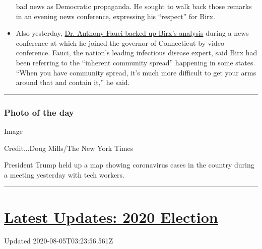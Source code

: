 \begin{itemize}
  bad news as Democratic propaganda. He sought to walk back those
  remarks in an evening news conference, expressing his ``respect'' for
  Birx.
\item
  Also yesterday,
  \href{https://www.nytimes.com/2020/08/03/world/coronavirus-covid-19.html\#link-4e40df05}{Dr.
  Anthony Fauci backed up Birx's analysis} during a news conference at
  which he joined the governor of Connecticut by video conference.
  Fauci, the nation's leading infectious disease expert, said Birx had
  been referring to the ``inherent community spread'' happening in some
  states. ``When you have community spread, it's much more difficult to
  get your arms around that and contain it,'' he said.
\end{itemize}

\begin{center}\rule{0.5\linewidth}{\linethickness}\end{center}

\hypertarget{photo-of-the-day}{%
\subsubsection{Photo of the day}\label{photo-of-the-day}}

Image

Credit...Doug Mills/The New York Times

President Trump held up a map showing coronavirus cases in the country
during a meeting yesterday with tech workers.

\begin{center}\rule{0.5\linewidth}{\linethickness}\end{center}

\hypertarget{latest-updates-2020-election}{%
\section{\texorpdfstring{\href{https://www.nytimes.com/2020/08/04/us/elections/primary-election-michigan-arizona-kansas.html?action=click\&pgtype=Article\&state=default\&region=MAIN_CONTENT_1\&context=storylines_live_updates}{Latest
Updates: 2020
Election}}{Latest Updates: 2020 Election}}\label{latest-updates-2020-election}}

Updated 2020-08-05T03:23:56.561Z

